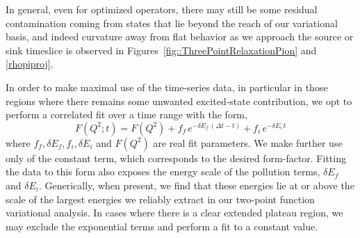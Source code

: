 
In general, even for optimized operators, there may still be some residual contamination coming from states that lie beyond the reach of our variational basis, and indeed curvature away from flat behavior as we approach the source or sink timeslice is observed in Figures~\ref{fig::ThreePointRelaxationPion} and \ref{rhopiproj}. 

In order to make maximal use of the time-series data, in particular in those regions where there remains some unwanted excited-state contribution, we opt to perform a correlated fit over a time range with the form,
\begin{equation}
F(Q^2; t) =  F(Q^2)  + f_f \, e^{-\delta E_{f}\,(\Delta t - t)} + f_{i} \,  e^{- \delta E_i\, t} 
\label{three_point_fit}
\end{equation}
where $f_f, \delta E_f, f_i, \delta E_i$ and $F(Q^2)$ are real fit parameters. We make further use only of the constant term, which corresponds to the desired form-factor. Fitting the data to this form also exposes the energy scale of the pollution terms, $\delta E_f$ and $\delta E_i$. Generically, when present, we find that these energies lie at or above the scale of the largest energies we reliably extract in our two-point function variational analysis. In cases where there is a clear extended plateau region, we may exclude the exponential terms and perform a fit to a constant value.


